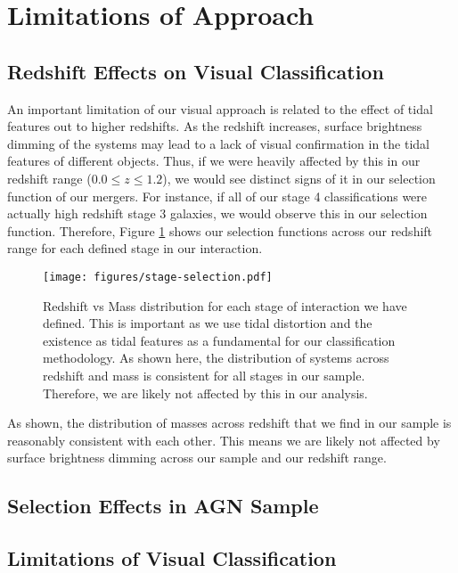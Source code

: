 \documentclass[fleqn,usenatbib]{mnras}
\begin{document}
\section{Limitations of Approach}\label{sec:limitations}
\subsection{Redshift Effects on Visual Classification}
\noindent An important limitation of our visual approach is related to the effect of tidal features out to higher redshifts. As the redshift increases, surface brightness dimming of the systems may lead to a lack of visual confirmation in the tidal features of different objects. Thus, if we were heavily affected by this in our redshift range ($0.0 \leq z \leq 1.2$), we would see distinct signs of it in our selection function of our mergers. For instance, if all of our stage 4 classifications were actually high redshift stage 3 galaxies, we would observe this in our selection function. Therefore, Figure \ref{fig:redshift_selection} shows our selection functions across our redshift range for each defined stage in our interaction.

\begin{figure}
    \centering
    \texttt{[image: figures/stage-selection.pdf]}
    \caption{Redshift vs Mass distribution for each stage of interaction we have defined. This is important as we use tidal distortion and the existence as tidal features as a fundamental for our classification methodology. As shown here, the distribution of systems across redshift and mass is consistent for all stages in our sample. Therefore, we are likely not affected by this in our analysis.}
    \label{fig:redshift_selection}
\end{figure}

As shown, the distribution of masses across redshift that we find in our sample is reasonably consistent with each other. This means we are likely not affected by surface brightness dimming across our sample and our redshift range.

\subsection{Selection Effects in AGN Sample}

\subsection{Limitations of Visual Classification}
\end{document}

